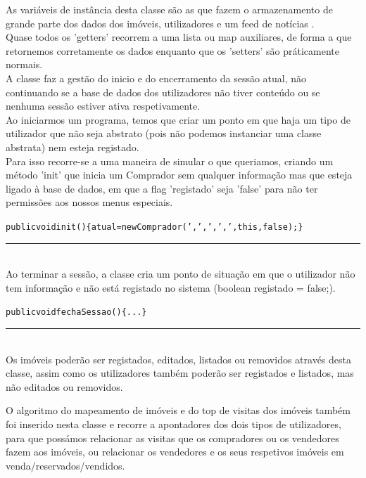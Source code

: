 \documentclass[12pt]{article}
\newenvironment{code}                    
{\textbf{
} \hspace{1cm} \hrulefill \\ 
\smallskip 
\begin{center}
\begin{minipage}{0.9\textwidth} 
\begin{alltt}\small}
{\end{alltt}
\end{minipage}
\end{center}
\hrule\smallskip
}
\begin{document}
As variáveis de instância desta classe são as que fazem o armazenamento de grande parte dos dados dos imóveis, utilizadores e um feed de notícias . 
\\

Quase todos os 'getters' recorrem a uma lista ou map auxiliares, de forma a que retornemos corretamente os dados enquanto que os 'setters' são práticamente normais.
\\

A classe faz a gestão do inicio e do encerramento da sessão atual, não continuando se a base de dados dos utilizadores não tiver conteúdo ou se nenhuma sessão estiver ativa respetivamente.
\\

Ao iniciarmos um programa, temos que criar um ponto em que haja um tipo de utilizador que não seja abstrato (pois não podemos instanciar uma classe abstrata) nem esteja registado.\\

Para isso recorre-se a uma maneira de simular o que queriamos, criando um método 'init' que inicia um Comprador sem qualquer informação mas que esteja ligado à base de dados, em que a flag 'registado' seja 'false' para não ter permissões aos nossos menus especiais.
\newline
\begin{code}
   public void init()\{atual = new Comprador (',',',',',this,false);\}
\end{code}
~\\

Ao terminar a sessão, a classe cria um ponto de situação em que o utilizador não tem informação e não está registado no sistema (boolean registado = false;).
\newline
\begin{code}
public void fechaSessao()\{... \}
\end{code}
~\\

Os imóveis poderão ser registados, editados, listados ou removidos através desta classe, assim como os utilizadores também poderão ser registados e listados, mas não editados ou removidos.

O algoritmo do mapeamento de imóveis e do top de visitas dos imóveis também foi inserido nesta classe e recorre a apontadores dos dois tipos de utilizadores, para que possámos relacionar as visitas que os compradores ou os vendedores fazem aos imóveis, ou relacionar os vendedores e os seus respetivos imóveis em venda/reservados/vendidos.
~\\
\end{document}

